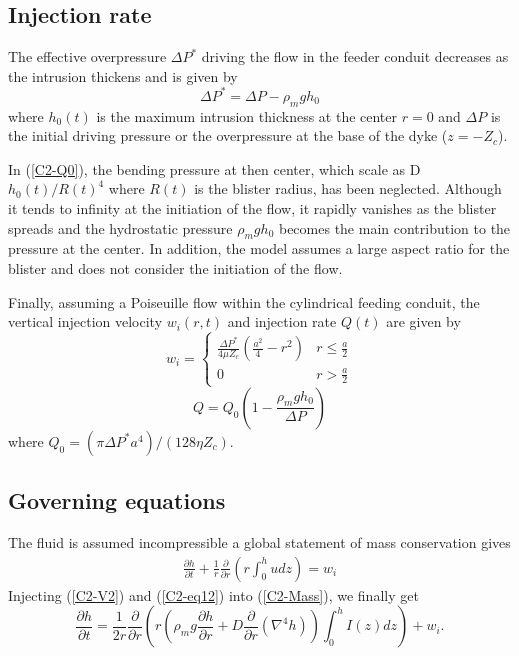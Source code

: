 \subsection{Injection rate}

The effective overpressure $\Delta P^*$ driving the flow in the feeder
conduit decreases as the intrusion thickens and is given by
\begin{equation}
  \Delta P^* = \Delta P -\rho_m g h_0 \label{C2-Q0}
\end{equation}
where $h_0(t)$ is the maximum  intrusion thickness at the center $r=0$
and $\Delta P$ is the initial  driving pressure or the overpressure at
the base of the dyke ($z = -Z_c$).

In (\ref{C2-Q0}), the bending pressure  at then center, which scale as
D$h_0(t)/R(t)^4$  where  $R(t)$  is   the  blister  radius,  has  been
neglected.  Although  it tends  to infinity at  the initiation  of the
flow, it rapidly  vanishes as the blister spreads  and the hydrostatic
pressure $\rho_m g h_0$ becomes  the main contribution to the pressure
at the  center.  In addition, the  model assumes a large  aspect ratio
for the blister and does not consider the initiation of the flow.

Finally,  assuming a  Poiseuille flow  within the  cylindrical feeding
conduit, the vertical injection velocity $w_i(r,t)$ and injection rate
$Q(t)$ are given by
\begin{equation}
  w_i=
  \begin{cases}
    \frac{ \Delta P^*}{4 \mu Z_{c}} (\frac{a^{2}}{4}-r^{2})& r \le \frac{a}{2}\\
    0 & r > \frac{a}{2}
  \end{cases}
  \label{C2-eq12}
\end{equation}
\begin{equation}
  Q = Q_0(1-\frac{\rho_m g h_0}{\Delta P})
  \label{C2-eq11}
\end{equation}
where $Q_0=\left(\pi \Delta P^* a^{4}\right)/\left(128 \eta Z_c\right)$.

\subsection{Governing equations}
\label{chap2-sec:governing-equations}

The  fluid  is  assumed  incompressible a  global  statement  of  mass
conservation gives
\begin{eqnarray}
  \frac{\partial         h}{\partial        t} +\frac{1}{r}
  \frac{\partial}{\partial
  r} \left( r\int_0^hudz\right) = w_i
  \label{C2-Mass}
\end{eqnarray}
Injecting (\ref{C2-V2})  and (\ref{C2-eq12}) into  (\ref{C2-Mass}), we
finally get
\begin{equation}
  \frac{\partial h}{\partial t} = \frac{1}{2r}
  \frac{\partial}{\partial r} \left( r\left(\rho_m g \frac{\partial h}{\partial      r}+D\frac{\partial}{\partial      r}\left(\nabla^4h\right)\right)\int_0^hI(z)dz\right)
  + w_i.
  \label{C2-EqConservation}
\end{equation}

